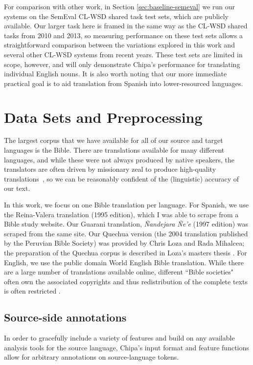 For comparison with other work, in Section \ref{sec:baseline-semeval} we run
our systems on the SemEval CL-WSD shared task test sets, which are publicly
available.  Our larger task here is framed in the same way as the CL-WSD shared
tasks from 2010 and 2013, so measuring performance on these test sets allows a
straightforward comparison between the variations explored in this work and
several other CL-WSD systems from recent years. These test sets are limited in
scope, however, and will only demonstrate Chipa's performance for translating
individual English nouns. It is also worth noting that our more immediate
practical goal is to aid translation from Spanish into lower-resourced
languages. 

\section{Data Sets and Preprocessing}
\label{sec:datasetsandpreprocessing}
The largest corpus that we have available for all of our source and target
languages is the Bible. There are translations available for many different
languages, and while these were not always produced by native speakers, the
translators are often driven by missionary zeal to produce high-quality
translations~\cite{DBLP:journals/lre/ResnikOD99}, so we can be reasonably
confident of the (linguistic) accuracy of our text.

In this work, we focus on one Bible translation per language. For Spanish, we
use the Reina-Valera translation (1995 edition), which I was able to scrape
from a Bible study website. Our Guarani translation, \emph{Ñandejara Ñe'e}
(1997 edition) was scraped from the same site. Our Quechua version (the 2004
translation published by the Peruvian Bible Society) was provided by Chris Loza
and Rada Mihalcea; the preparation of the Quechua corpus is described in Loza's
masters thesis \cite{chrisloza}. For English, we use the public domain World
English Bible translation.
While there are a large number of translations available online, different
``Bible societies" often own the associated copyrights and thus redistribution
of the complete texts is often restricted \cite{MAYER14.220.L14-1215}.

\subsection{Source-side annotations}
\label{sec:annotations}
In order to gracefully include a variety of features and build on
any available analysis tools for the source language, Chipa's input format and
feature functions allow for arbitrary annotations on source-language tokens.

